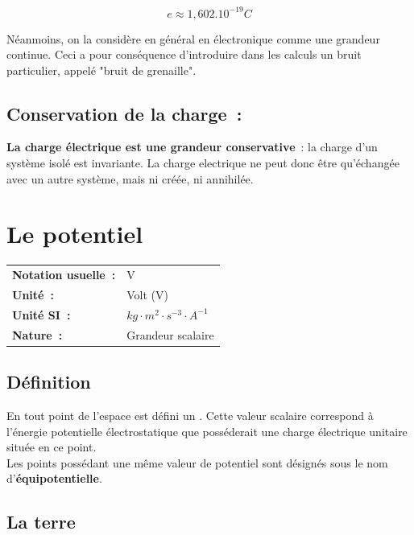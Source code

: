 \begin{equation}
	e \approx 1,602.10^{-19} C
\end{equation}

Néanmoins, on la considère en général en électronique comme une grandeur continue. Ceci a pour conséquence d'introduire dans les calculs un bruit particulier, appelé "bruit de grenaille".

\subsection*{ Conservation de la charge~: }

\textbf{La charge électrique est une grandeur conservative}~: la charge d'un système isolé est invariante. La charge electrique ne peut donc être qu'échangée avec un autre système, mais ni créée, ni annihilée.

\section{Le potentiel}

\begin{tabular}{ll}
\textbf{Notation usuelle~:} & V \\
\textbf{Unité~:} & Volt (V)\\
\textbf{Unité SI~:} & ${kg} \cdot m^2 \cdot {s}^{-3} \cdot A^{-1}$ \\
\textbf{Nature~:} & Grandeur scalaire \\ 
\end{tabular}

\subsection*{Définition}

En tout point de l'espace est défini un . Cette valeur scalaire correspond à l'énergie potentielle électrostatique que posséderait une charge électrique unitaire située en ce point. \\ 

Les points possédant une même valeur de potentiel sont désignés sous le nom d'\textbf{équipotentielle}.

\subsection*{La terre}

